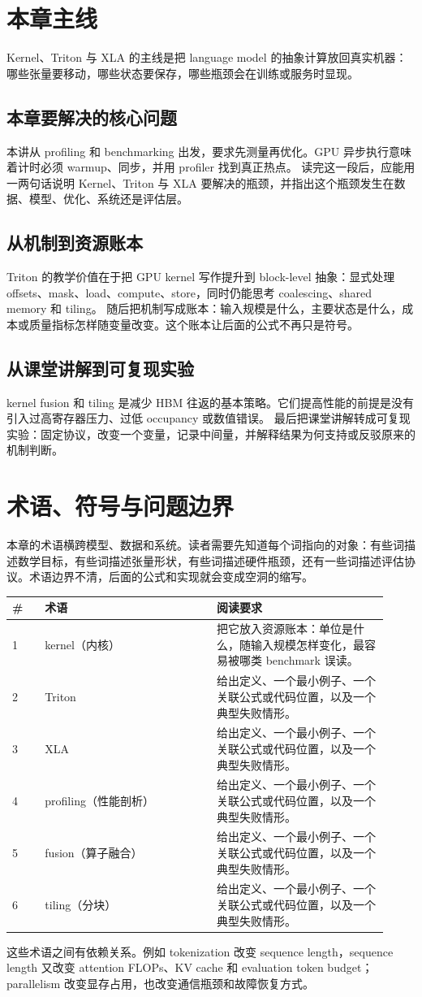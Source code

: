 \documentclass[a4paper]{article}
\begin{document}
\section{本章主线}
Kernel、Triton 与 XLA 的主线是把 language model 的抽象计算放回真实机器：哪些张量要移动，哪些状态要保存，哪些瓶颈会在训练或服务时显现。
\subsection{本章要解决的核心问题}
本讲从 profiling 和 benchmarking 出发，要求先测量再优化。GPU 异步执行意味着计时必须 warmup、同步，并用 profiler 找到真正热点。
读完这一段后，应能用一两句话说明 Kernel、Triton 与 XLA 要解决的瓶颈，并指出这个瓶颈发生在数据、模型、优化、系统还是评估层。
\subsection{从机制到资源账本}
Triton 的教学价值在于把 GPU kernel 写作提升到 block-level 抽象：显式处理 offsets、mask、load、compute、store，同时仍能思考 coalescing、shared memory 和 tiling。
随后把机制写成账本：输入规模是什么，主要状态是什么，成本或质量指标怎样随变量改变。这个账本让后面的公式不再只是符号。
\subsection{从课堂讲解到可复现实验}
kernel fusion 和 tiling 是减少 HBM 往返的基本策略。它们提高性能的前提是没有引入过高寄存器压力、过低 occupancy 或数值错误。
最后把课堂讲解转成可复现实验：固定协议，改变一个变量，记录中间量，并解释结果为何支持或反驳原来的机制判断。
\section{术语、符号与问题边界}
本章的术语横跨模型、数据和系统。读者需要先知道每个词指向的对象：有些词描述数学目标，有些词描述张量形状，有些词描述硬件瓶颈，还有一些词描述评估协议。术语边界不清，后面的公式和实现就会变成空洞的缩写。
\begin{longtable}{p{0.08\linewidth}p{0.42\linewidth}p{0.42\linewidth}}
\toprule
\textbf{\#} & \textbf{术语} & \textbf{阅读要求}\\
\midrule
1 & kernel（内核） & 把它放入资源账本：单位是什么，随输入规模怎样变化，最容易被哪类 benchmark 误读。\\
2 & Triton & 给出定义、一个最小例子、一个关联公式或代码位置，以及一个典型失败情形。\\
3 & XLA & 给出定义、一个最小例子、一个关联公式或代码位置，以及一个典型失败情形。\\
4 & profiling（性能剖析） & 给出定义、一个最小例子、一个关联公式或代码位置，以及一个典型失败情形。\\
5 & fusion（算子融合） & 给出定义、一个最小例子、一个关联公式或代码位置，以及一个典型失败情形。\\
6 & tiling（分块） & 给出定义、一个最小例子、一个关联公式或代码位置，以及一个典型失败情形。\\
\bottomrule
\end{longtable}
这些术语之间有依赖关系。例如 tokenization 改变 sequence length，sequence length 又改变 attention FLOPs、KV cache 和 evaluation token budget；parallelism 改变显存占用，也改变通信瓶颈和故障恢复方式。
\end{document}
